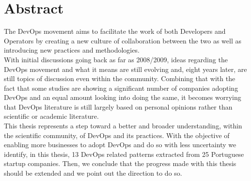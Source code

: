 \chapter*{Abstract}

The DevOps movement aims to facilitate the work of both Developers and Operators by creating a new culture of collaboration between the two as well as introducing new practices and methodologies. \\
With initial discussions going back as far as 2008/2009, ideas regarding the DevOps movement and what it means are still evolving and, eight years later, are still topics of discussion even within the community. Combining that with the fact that some studies are showing a significant number of companies adopting DevOps and an equal amount looking into doing the same, it becomes worrying that DevOps literature is still largely based on personal opinions rather than scientific or academic literature. \\
This thesis represents a step toward a better and broader understanding, within the scientific community, of DevOps and its practices. With the objective of enabling more businesses to adopt DevOps and do so with less uncertainty we identify, in this thesis, 13 DevOps related patterns extracted from 25 Portuguese startup companies. Then, we conclude that the progress made with this thesis should be extended and we point out the direction to do so.


